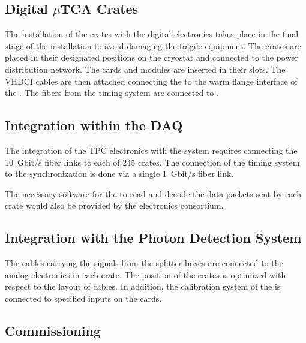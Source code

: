 \subsection{Digital $\mu$TCA Crates}
\label{ssec:dp-tpcelec-install-utca}

The installation of the  crates with the digital electronics takes place in the final stage of the  installation to avoid damaging the fragile equipment. The crates are placed in their designated positions on the cryostat and connected to the power distribution network. The  cards and  modules are inserted in their slots. The VHDCI cables are then attached connecting the   to the warm flange interface of the .  The fibers from the timing system are connected to . 

\subsection{Integration within the DAQ}
\label{ssec:dp-tpcelec-install-daq}

The integration of the \dual TPC electronics with the  system requires connecting the \SI{10}{Gbit/s} fiber links to each of \num{245}  crates. The connection of the timing system to the synchronization  is done via a single \SI{1}{Gbit/s} fiber link. 

The necessary software for the  to read and decode the data packets sent by each  crate would also be provided by the electronics consortium.  

\subsection{Integration with the Photon Detection System}
\label{ssec:dp-tpcelec-install-pmt}

The cables carrying the  signals from the splitter boxes are connected to the  analog electronics in each  crate. The position of the crates is optimized with respect to the layout of  cables. In addition, the calibration system of the  is connected to specified inputs on the cards.


\subsection{Commissioning}
\label{ssec:dp-tpcelec-install-comission}

